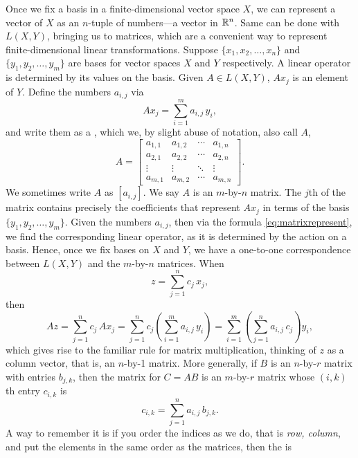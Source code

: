 Once we fix a basis in a finite-dimensional
vector space $X$, we can represent a vector of $X$ as an $n$-tuple of
numbers---a vector in ${\mathbb{R}}^n$.
Same can be done with $L(X,Y)$, bringing us to matrices,
which are a convenient way to represent
finite-dimensional linear transformations.
Suppose $\{ x_1, x_2, \ldots, x_n \}$ and $\{ y_1, y_2, \ldots, y_m \}$
are bases for vector spaces $X$ and $Y$ respectively.  A linear operator is 
determined by its values on the basis.  Given $A \in L(X,Y)$,
$A x_j$ is an element of $Y$.  Define the numbers
$a_{i,j}$ via
\begin{equation} \label{eq:matrixrepresent}
A x_j = \sum_{i=1}^m a_{i,j} \, y_i ,
\end{equation}
and write them as a \emph{},
which we, by slight abuse of notation, also call $A$,
\begin{equation*}
A =
\begin{bmatrix}
a_{1,1} & a_{1,2} & \cdots & a_{1,n} \\
a_{2,1} & a_{2,2} & \cdots & a_{2,n} \\
\vdots & \vdots & \ddots & \vdots \\
a_{m,1} & a_{m,2} & \cdots & a_{m,n}
\end{bmatrix} .
\end{equation*}
We sometimes write $A$ as $[a_{i,j}]$.
We say $A$ is an $m$-by-$n$ matrix.
The $j$th \emph{} of the matrix contains precisely the coefficients
that represent $A x_j$ in terms of the basis $\{ y_1,y_2,\ldots,y_m \}$.
Given the numbers $a_{i,j}$, then via the formula
\eqref{eq:matrixrepresent}, we find the corresponding linear operator,
as it is determined by the action on a basis.  Hence, once we fix
bases on $X$ and $Y$, we have a one-to-one correspondence between
$L(X,Y)$ and the $m$-by-$n$ matrices.
When
\begin{equation*}
z = \sum_{j=1}^n c_j \, x_j ,
\end{equation*}
then
\begin{equation*}
A z =
\sum_{j=1}^n c_j \, A x_j 
=
\sum_{j=1}^n c_j \left( \sum_{i=1}^m  a_{i,j}\, y_i \right) 
=
\sum_{i=1}^m \left(\sum_{j=1}^n  a_{i,j}\, c_j \right) y_i ,
\end{equation*}
which gives rise to the familiar rule for matrix multiplication,
thinking of $z$ as a column vector, that is, an $n$-by-1 matrix.
%
More generally, if $B$ is an $n$-by-$r$ matrix with entries $b_{j,k}$, then 
the matrix for $C = AB$ is an $m$-by-$r$ matrix whose $(i,k)$th entry
$c_{i,k}$ is
\begin{equation*}
c_{i,k} =
\sum_{j=1}^n a_{i,j}\,b_{j,k} .
\end{equation*}
A way to remember it is if you order the indices as we do, that is
\emph{row, column}, and put the elements in the same order as the matrices,
then the  is 

